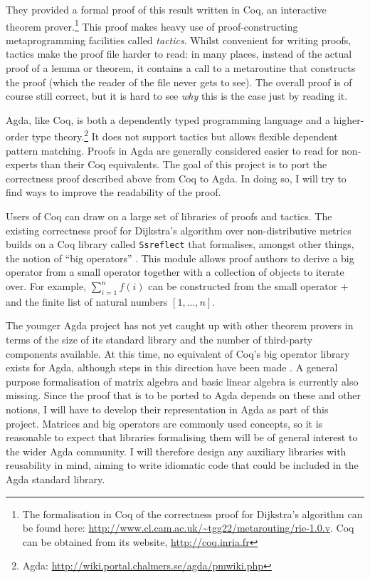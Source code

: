 \documentclass[a4paper]{scrartcl}
\begin{document}
They provided a formal proof of this result written in Coq, an interactive theorem prover.\footnote{The formalisation in Coq of the correctness proof for Dijkstra's algorithm can be found here: \url{http://www.cl.cam.ac.uk/~tgg22/metarouting/rie-1.0.v}. Coq can be obtained from its website, \url{http://coq.inria.fr}} This proof makes heavy use of proof-constructing metaprogramming facilities called \emph{tactics}. Whilst convenient for writing proofs, tactics make the proof file harder to read: in many places, instead of the actual proof of a lemma or theorem, it contains a call to a metaroutine that constructs the proof (which the reader of the file never gets to see). The overall proof is of course still correct, but it is hard to see \emph{why} this is the case just by reading it.

Agda, like Coq, is both a dependently typed programming language and a higher-order type theory.\footnote{Agda: \url{http://wiki.portal.chalmers.se/agda/pmwiki.php}} 
It does not support tactics but allows flexible dependent pattern matching. Proofs in Agda are generally considered easier to read for non-experts than their Coq equivalents. The goal of this project is to port the correctness proof described above from Coq to Agda. In doing so, I will try to find ways to improve the readability of the proof.

Users of Coq can draw on a large set of libraries of proofs and tactics. The existing correctness proof for Dijkstra's algorithm over non-distributive metrics builds on a Coq library called \texttt{Ssreflect} that formalises, amongst other things, the notion of \enquote{big operators} \autocite{bertot_canonical_2008}. This module allows proof authors to derive a big operator from a small operator together with a collection of objects to iterate over. For example, \(\sum_{i=1}^n f(i)\) can be constructed from the small operator \(+\) and the finite list of natural numbers \([1, \dots, n]\).

The younger Agda project has not yet caught up with other theorem provers in terms of the size of its standard library and the number of third-party components available. At this time, no equivalent of Coq's big operator library exists for Agda, although steps in this direction have been made \autocite{gustafsson_foldable_2014}. A general purpose formalisation of matrix algebra and basic linear algebra is currently also missing. Since the proof that is to be ported to Agda depends on these and other notions, I will have to develop their representation in Agda as part of this project. Matrices and big operators are commonly used concepts, so it is reasonable to expect that libraries formalising them will be of general interest to the wider Agda community. I will therefore design any auxiliary libraries with reusability in mind, aiming to write idiomatic code that could be included in the Agda standard library.
\end{document}
